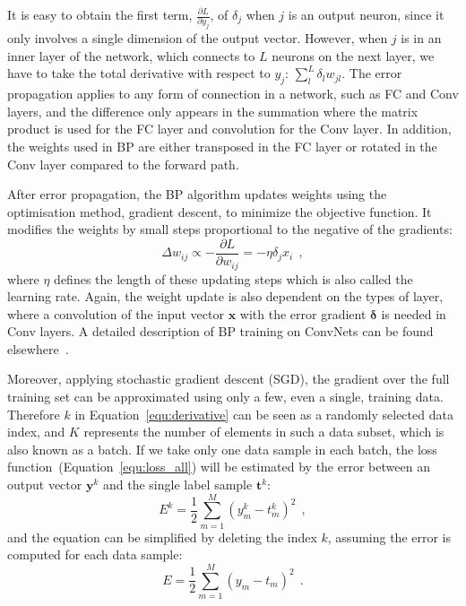 It is easy to obtain the first term, $ \frac{\partial L}{\partial y_j}  $, of $ \delta_j $ when $j$ is an output neuron, since it only involves a single dimension of the output vector.
However, when $j$ is in an inner layer of the network, which connects to $L$ neurons on the next layer, we have to take the total derivative with respect to $y_j$: $\sum_l^L \delta_l w_{jl}$.
The error propagation applies to any form of connection in a network, such as FC and Conv layers, and the difference only appears in the summation where the matrix product is used for the FC layer and convolution for the Conv layer.
In addition, the weights used in BP are either transposed in the FC layer or rotated in the Conv layer compared to the forward path.

After error propagation, the BP algorithm updates weights using the optimisation method, gradient descent, to minimize the objective function.
It modifies the weights by small steps proportional to the negative of the gradients:
\begin{equation}
\Delta w_{ij} \propto -\frac{\partial L}{\partial w_{ij}} = -\eta \delta_j x_i~~,
\label{equ:delta_w}
\end{equation}
where $\eta$ defines the length of these updating steps which is also called the learning rate.
Again, the weight update is also dependent on the types of layer, where a convolution of the input vector $\mathbf{x}$ with the error gradient  $\mathbf{\delta}$ is needed in Conv layers.
A detailed description of BP training on ConvNets can be found elsewhere~\citep{bouvrie2006notes}.

Moreover, applying stochastic gradient descent (SGD), the gradient over the full training set can be approximated using only a few, even a single, training data.
Therefore $k$ in Equation~\ref{equ:derivative} can be seen as a randomly selected data index, and $K$ represents the number of elements in such a data subset, which is also known as a batch.
If we take only one data sample in each batch, the loss function~(Equation~\ref{equ:loss_all}) will be estimated by the error between an output vector $\mathbf{y}^k$ and the single label sample $\mathbf{t}^k$:
\begin{equation}
E^k = \frac{1}{2}\sum_{m=1}^M (y^{k}_{m}-t^{k}_{m})^{2}~~,
\label{equ:error_conv}
\end{equation}
and the equation can be simplified by deleting the index $k$, assuming the error is computed for each data sample:
\begin{equation}
E = \frac{1}{2}\sum_{m=1}^M (y_{m}-t_{m})^{2}~~.
\label{equ:error_non}
\end{equation}


